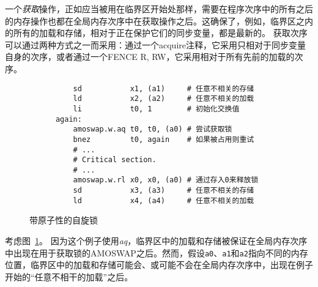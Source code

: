 一个{\em 获取}操作，正如应当被用在临界区开始处那样，需要在程序次序中的所有之后的内存操作也都在全局内存次序中在获取操作之后。这确保了，例如，临界区之内的所有的加载和存储，相对于正在保护它们的同步变量，都是最新的。
获取次序可以通过两种方式之一而采用：通过一个acquire注释，它采用只相对于同步变量自身的次序，或者通过一个FENCE R, RW，它采用相对于所有先前的加载的次序。

\begin{figure}[h!]
  \centering\small
  \begin{verbatim}
          sd           x1, (a1)     # 任意不相关的存储 
          ld           x2, (a2)     # 任意不相关的加载  
          li           t0, 1        # 初始化交换值 
      again:
          amoswap.w.aq t0, t0, (a0) # 尝试获取锁 
          bnez         t0, again    # 如果被占用则重试 
          # ...
          # Critical section.
          # ...
          amoswap.w.rl x0, x0, (a0) # 通过存入0来释放锁 
          sd           x3, (a3)     # 任意不相关的存储 
          ld           x4, (a4)     # 任意不相关的加载 
  \end{verbatim}
  \caption{带原子性的自旋锁}
  \label{fig:litmus:spinlock_atomics}
\end{figure}

考虑图~\ref{fig:litmus:spinlock_atomics}。
因为这个例子使用{\em aq}，临界区中的加载和存储被保证在全局内存次序中出现在用于获取锁的AMOSWAP之后。然而，假设{\tt a0}、{\tt a1}和{\tt a2}指向不同的内存位置，临界区中的加载和存储可能会、或可能不会在全局内存次序中，出现在例子开始的“任意不相干的加载”之后。

